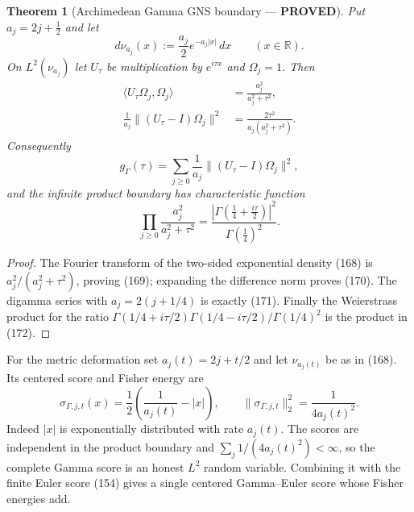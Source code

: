 \documentclass[11pt]{article}
\newtheorem{theorem}{Theorem}
\newcommand{\PROVED}{\textcolor{green!45!black}{\textbf{PROVED}}}
\begin{document}
\begin{theorem}[Archimedean Gamma GNS boundary --- \PROVED]
Put $a_j=2j+\tfrac12$ and let
\begin{equation}
 d\nu_{a_j}(x):=\frac{a_j}{2}e^{-a_j|x|}\,dx
 \qquad(x\in\mathbb R).                                \tag{168}
\end{equation}
On $L^2(\nu_{a_j})$ let $U_\tau$ be multiplication by $e^{i\tau x}$ and
$\Omega_j=1$.  Then
\begin{align}
 \langle U_\tau\Omega_j,\Omega_j\rangle
 &=\frac{a_j^2}{a_j^2+\tau^2},                         \tag{169}\\
 \frac1{a_j}\|(U_\tau-I)\Omega_j\|^2
 &=\frac{2\tau^2}{a_j(a_j^2+\tau^2)}.                 \tag{170}
\end{align}
Consequently
\begin{equation}
 g_\Gamma(\tau)
 =\sum_{j\ge0}\frac1{a_j}\|(U_\tau-I)\Omega_j\|^2,  \tag{171}
\end{equation}
and the infinite product boundary has characteristic function
\begin{equation}
 \prod_{j\ge0}\frac{a_j^2}{a_j^2+\tau^2}
 =\frac{|\Gamma(\frac14+\frac{i\tau}{2})|^2}
        {\Gamma(\frac14)^2}.                           \tag{172}
\end{equation}
\end{theorem}

\begin{proof}
The Fourier transform of the two-sided exponential density (168) is
$a_j^2/(a_j^2+\tau^2)$, proving (169); expanding the difference norm proves
(170).  The digamma series with
$a_j=2(j+1/4)$ is exactly (171).  Finally the Weierstrass product for the
ratio
$\Gamma(1/4+i\tau/2)\Gamma(1/4-i\tau/2)/\Gamma(1/4)^2$
is the product in (172).
\end{proof}

For the metric deformation set $a_j(t)=2j+t/2$ and let $\nu_{a_j(t)}$ be
as in (168).  Its centered score and Fisher energy are
\begin{equation}
 \sigma_{\Gamma,j,t}(x)
 =\frac12\left(\frac1{a_j(t)}-|x|\right),
 \qquad
 \|\sigma_{\Gamma,j,t}\|_2^2=\frac1{4a_j(t)^2}.       \tag{173}
\end{equation}
Indeed $|x|$ is exponentially distributed with rate $a_j(t)$.  The scores
are independent in the product boundary and
$\sum_j1/(4a_j(t)^2)<\infty$, so the complete Gamma score is an honest
$L^2$ random variable.  Combining it with the finite Euler score (154)
gives a single centered Gamma--Euler score whose Fisher energies add.
\end{document}

